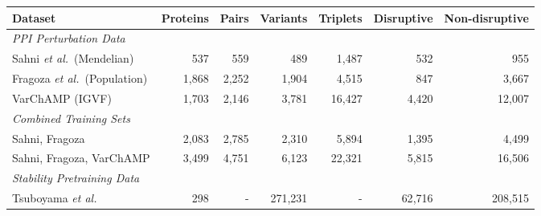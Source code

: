 \begin{tabular}{lrrrrrr}
\hline
\textbf{Dataset} & \textbf{Proteins} & \textbf{Pairs} & \textbf{Variants} & \textbf{Triplets} & \textbf{Disruptive} & \textbf{Non-disruptive} \\
\hline
\multicolumn{7}{l}{\textit{PPI Perturbation Data}} \\
Sahni \textit{et al.}~(Mendelian) & 537 & 559 & 489 & 1{,}487 & 532 & 955 \\
Fragoza \textit{et al.}~(Population) & 1{,}868 & 2{,}252 & 1{,}904 & 4{,}515 & 847 & 3{,}667 \\
VarChAMP (IGVF) & 1{,}703 & 2{,}146 & 3{,}781 & 16{,}427 & 4{,}420 & 12{,}007 \\
\hline
\multicolumn{7}{l}{\textit{Combined Training Sets}} \\
Sahni, Fragoza & 2{,}083 & 2{,}785 & 2{,}310 & 5{,}894 & 1{,}395 & 4{,}499 \\
Sahni, Fragoza, VarChAMP & 3{,}499 & 4{,}751 & 6{,}123 & 22{,}321 & 5{,}815 & 16{,}506 \\
\hline
\multicolumn{7}{l}{\textit{Stability Pretraining Data}} \\
Tsuboyama \textit{et al.} & 298 & - & 271{,}231 & - & 62{,}716 & 208{,}515 \\
\hline
\end{tabular}
